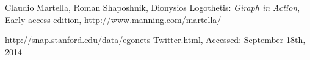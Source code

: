 \begin{thebibliography}{99}
 Claudio Martella, Roman Shaposhnik, Dionysios Logothetis: \textit{Giraph in Action}, Early access edition, http://www.manning.com/martella/

 http://snap.stanford.edu/data/egonets-Twitter.html, Accessed: September 18th, 2014 

\end{thebibliography}

